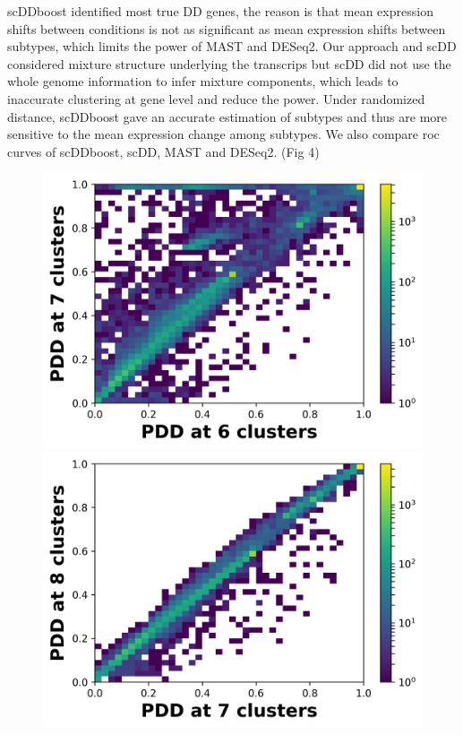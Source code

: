 \documentclass[11pt]{amsart}
\begin{document}
scDDboost identified most true DD genes, the reason is that mean expression shifts between conditions is not as significant as mean expression shifts between subtypes, which limits the power of MAST and DESeq2. Our approach and scDD considered mixture structure underlying the transcrips but scDD did not use the whole genome information to infer mixture components, which leads to inaccurate clustering at gene level and reduce the power. Under randomized distance, scDDboost gave an accurate estimation of subtypes and thus are more sensitive to the mean expression change among subtypes. We also compare roc curves of scDDboost, scDD, MAST and DESeq2. (Fig 4)
\begin{figure}[h]
\vspace{-\parskip}
  \includegraphics[width=\textwidth]{Figs/sim_67.png}
\endminipage\hfill
{}
  \includegraphics[width=\textwidth]{Figs/sim_78.png}

\end{figure}
\end{document}
